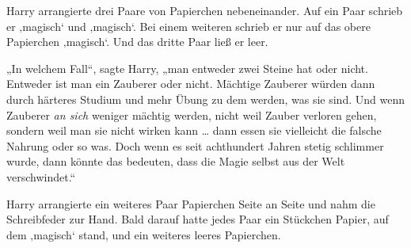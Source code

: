 Harry arrangierte drei Paare von Papierchen nebeneinander. Auf ein Paar schrieb er ‚magisch‘ und ‚magisch‘. Bei einem weiteren schrieb er nur auf das obere Papierchen ‚magisch‘. Und das dritte Paar ließ er leer.

„In welchem Fall“, sagte Harry, „man entweder zwei Steine hat oder nicht. Entweder ist man ein Zauberer oder nicht. Mächtige Zauberer würden dann durch härteres Studium und mehr Übung zu dem werden, was sie sind. Und wenn Zauberer \emph{an sich} weniger mächtig werden, nicht weil Zauber verloren gehen, sondern weil man sie nicht wirken kann … dann essen sie vielleicht die falsche Nahrung oder so was. Doch wenn es seit achthundert Jahren stetig schlimmer wurde, dann könnte das bedeuten, dass die Magie selbst aus der Welt verschwindet.“

Harry arrangierte ein weiteres Paar Papierchen Seite an Seite und nahm die Schreibfeder zur Hand. Bald darauf hatte jedes Paar ein Stückchen Papier, auf dem ‚magisch‘ stand, und ein weiteres leeres Papierchen.

